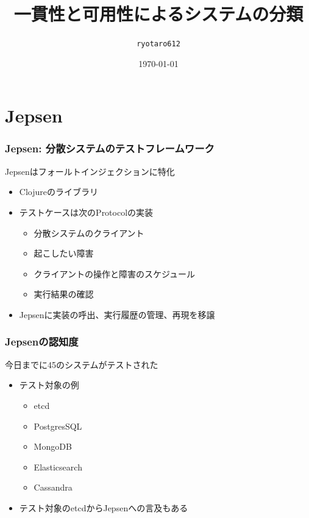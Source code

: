 \documentclass[unicode, 14pt, aspectratio=169]{beamer}
\date{\today}
\title{一貫性と可用性によるシステムの分類}
\author{\texttt{ryotaro612}}
\begin{document}
\begin{frame}
\titlepage
\end{frame}
\section{Jepsen}

\begin{frame}
  \frametitle{Jepsen: 分散システムのテストフレームワーク\supercite{jepsen}}
  {\large Jepsenはフォールトインジェクションに特化}
  \begin{itemize}
  \item Clojureのライブラリ
  \item テストケースは次のProtocol\supercite{clojure-protocols}の実装
    \begin{itemize}
    \item 分散システムのクライアント
    \item 起こしたい障害
    \item クライアントの操作と障害のスケジュール
    \item 実行結果の確認
    \end{itemize}
  \item Jepsenに実装の呼出、実行履歴の管理、再現を移譲
  \end{itemize}
\end{frame}
\begin{frame}
  \frametitle{Jepsenの認知度}
  {\large 今日までに45のシステムがテストされた\supercite{jepsen-analysis}}
  \begin{itemize}
  \item テスト対象の例
    \begin{itemize}
    \item etcd
    \item PostgresSQL
    \item MongoDB
    \item Elasticsearch
    \item Cassandra
    \end{itemize}
  \item テスト対象のetcdからJepsenへの言及もある\supercite{jepsen-etcd}
  \end{itemize}
\end{frame}
\end{document}
